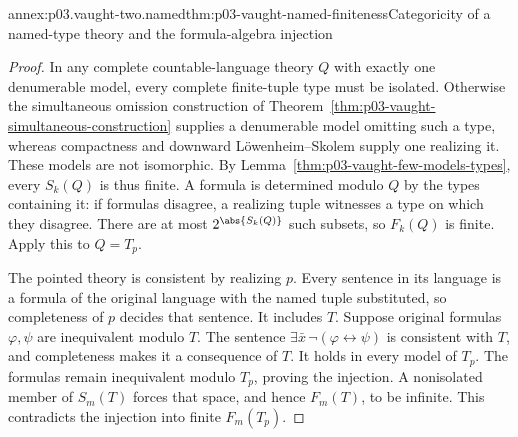 \begin{annexitem}{annex:p03.vaught-two.named}{thm:p03-vaught-named-finiteness}{Categoricity of a named-type theory and the formula-algebra injection}
\begin{proof}
In any complete countable-language theory \(Q\) with exactly one
denumerable model, every complete finite-tuple type must be isolated.
Otherwise the simultaneous omission construction of
Theorem~\ref{thm:p03-vaught-simultaneous-construction} supplies a
denumerable model omitting such a type, whereas compactness and downward
L\"owenheim--Skolem supply one realizing it. These models are not
isomorphic. By Lemma~\ref{thm:p03-vaught-few-models-types}, every
\(S_k(Q)\) is thus finite. A formula is determined modulo \(Q\) by the
types containing it: if formulas disagree, a realizing tuple witnesses a
type on which they disagree. There are at most \(2^{\abs{S_k(Q)}}\)
such subsets, so \(F_k(Q)\) is finite. Apply this to \(Q=T_p\).

The pointed theory is consistent by realizing \(p\). Every sentence in its
language is a formula of the original language with the named tuple
substituted, so completeness of \(p\) decides that sentence. It includes
\(T\). Suppose original formulas \(\varphi,\psi\) are inequivalent
modulo \(T\). The sentence
\(\exists\bar x\,\neg(\varphi\leftrightarrow\psi)\) is consistent
with \(T\), and completeness makes it a consequence of \(T\).
It holds in every model of \(T_p\). The formulas remain inequivalent
modulo \(T_p\), proving the injection. A nonisolated member of
\(S_m(T)\) forces that space, and hence \(F_m(T)\), to be infinite.
This contradicts the injection into finite \(F_m(T_p)\).
\end{proof}
\end{annexitem}

